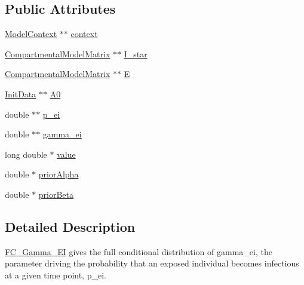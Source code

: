 \subsection*{Public Attributes}
\begin{DoxyCompactItemize}
\item 
\hyperlink{classSpatialSEIR_1_1ModelContext}{Model\-Context} $\ast$$\ast$ \hyperlink{classSpatialSEIR_1_1FC__Gamma__EI_a72fcb8c17cc8abf66d56f8282397a0b2}{context}
\item 
\hyperlink{classSpatialSEIR_1_1CompartmentalModelMatrix}{Compartmental\-Model\-Matrix} $\ast$$\ast$ \hyperlink{classSpatialSEIR_1_1FC__Gamma__EI_a1160b335f074316d5c7cda9ed37c6718}{I\-\_\-star}
\item 
\hyperlink{classSpatialSEIR_1_1CompartmentalModelMatrix}{Compartmental\-Model\-Matrix} $\ast$$\ast$ \hyperlink{classSpatialSEIR_1_1FC__Gamma__EI_a0713816be274377c626114b530924f55}{E}
\item 
\hyperlink{classSpatialSEIR_1_1InitData}{Init\-Data} $\ast$$\ast$ \hyperlink{classSpatialSEIR_1_1FC__Gamma__EI_a10bf326741fabf11d4fbc734ab933049}{A0}
\item 
double $\ast$$\ast$ \hyperlink{classSpatialSEIR_1_1FC__Gamma__EI_a2d06cf55d4efdc31b421be96583cd9e7}{p\-\_\-ei}
\item 
double $\ast$$\ast$ \hyperlink{classSpatialSEIR_1_1FC__Gamma__EI_a6c9eaf49e5c3464a819cc3ed15b58001}{gamma\-\_\-ei}
\item 
long double $\ast$ \hyperlink{classSpatialSEIR_1_1FC__Gamma__EI_a925437301fd547a6cc95dbe62d061e34}{value}
\item 
double $\ast$ \hyperlink{classSpatialSEIR_1_1FC__Gamma__EI_aad60d0e3253e705c661a083889c5390e}{prior\-Alpha}
\item 
double $\ast$ \hyperlink{classSpatialSEIR_1_1FC__Gamma__EI_a784d43fdd90ee401dc597c6aae2ce952}{prior\-Beta}
\end{DoxyCompactItemize}


\subsection{Detailed Description}
\hyperlink{classSpatialSEIR_1_1FC__Gamma__EI}{F\-C\-\_\-\-Gamma\-\_\-\-E\-I} gives the full conditional distribution of gamma\-\_\-ei, the parameter driving the probability that an exposed individual becomes infectious at a given time point, p\-\_\-ei. 

